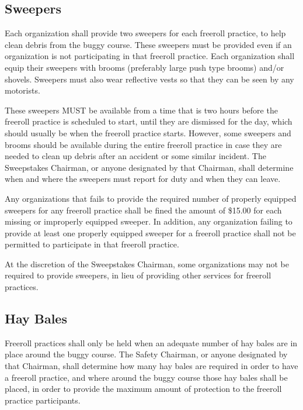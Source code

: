 \subsection{Sweepers}

	Each organization shall provide two sweepers for each freeroll practice, to
	help clean debris from the buggy course. These sweepers must be provided even
	if an organization is not participating in that freeroll practice. Each
	organization shall equip their sweepers with brooms (preferably large push type
	brooms) and/or shovels. Sweepers must also wear reflective vests so that they
	can be seen by any motorists.

	These sweepers MUST be available from a time that is two hours before the
	freeroll practice is scheduled to start, until they are dismissed for the day,
	which should usually be when the freeroll practice starts. However, some
	sweepers and brooms should be available during the entire freeroll practice in
	case they are needed to clean up debris after an accident or some similar
	incident. The Sweepstakes Chairman, or anyone designated by that Chairman,
	shall determine when and where the sweepers must report for duty and when they
	can leave.

	Any organizations that fails to provide the required number of properly
	equipped sweepers for any freeroll practice shall be fined the amount of
	\$15.00 for each missing or improperly equipped sweeper. In addition, any
	organization failing to provide at least one properly equipped sweeper for a
	freeroll practice shall not be permitted to participate in that freeroll
	practice.

	At the discretion of the Sweepstakes Chairman, some organizations may not be
	required to provide sweepers, in lieu of providing other services for freeroll
	practices.

\subsection{Hay Bales}

	Freeroll practices shall only be held when an adequate number of hay bales are
	in place around the buggy course. The Safety Chairman, or anyone designated by
	that Chairman, shall determine how many hay bales are required in order to have
	a freeroll practice, and where around the buggy course those hay bales shall be
	placed, in order to provide the maximum amount of protection to the freeroll
	practice participants.

